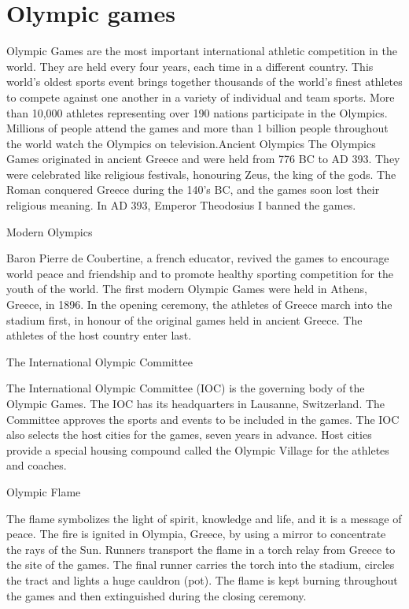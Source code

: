 \documentclass[
  openany]{book}
\begin{document}
\hypertarget{olympic-games}{%
\section{Olympic games}\label{olympic-games}}

Olympic Games are the most important international athletic competition in the world. They are held every four years, each time in a different country. This world's oldest sports event brings together thousands of the world's finest athletes to compete against one another in a variety of individual and team sports. More than 10,000 athletes representing over 190 nations participate in the Olympics. Millions of people attend the games and more than 1 billion people throughout the world watch the Olympics on television.Ancient Olympics The Olympics Games originated in ancient Greece and were held from 776 BC to AD 393. They were celebrated like religious festivals, honouring Zeus, the king of the gods. The Roman conquered Greece during the 140's BC, and the games soon lost their religious meaning. In AD 393, Emperor Theodosius I banned the games.

Modern Olympics

Baron Pierre de Coubertine, a french educator, revived the games to encourage world peace and friendship and to promote healthy sporting competition for the youth of the world. The first modern Olympic Games were held in Athens, Greece, in 1896. In the opening ceremony, the athletes of Greece march into the stadium first, in honour of the original games held in ancient Greece. The athletes of the host country enter last.

The International Olympic Committee

The International Olympic Committee (IOC) is the governing body of the Olympic Games. The IOC has its headquarters in Lausanne, Switzerland. The Committee approves the sports and events to be included in the games. The IOC also selects the host cities for the games, seven years in advance. Host cities provide a special housing compound called the Olympic Village for the athletes and coaches.

Olympic Flame

The flame symbolizes the light of spirit, knowledge and life, and it is a message of peace. The fire is ignited in Olympia, Greece, by using a mirror to concentrate the rays of the Sun. Runners transport the flame in a torch relay from Greece to the site of the games. The final runner carries the torch into the stadium, circles the tract and lights a huge cauldron (pot). The flame is kept burning throughout the games and then extinguished during the closing ceremony.
\end{document}
